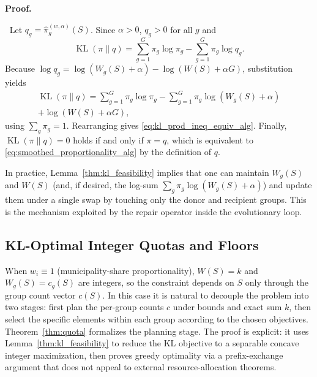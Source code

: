 \documentclass[10pt,journal]{IEEEtran}
\makeatletter
\newcommand{\1}{\mathbf{1}}
\DeclareMathOperator{\KL}{KL}
\theoremstyle{ieeethm}
\renewcommand{\IEEEproofname}{Proof}
\renewenvironment{IEEEproof}[1][\IEEEproofname]{%
  \par\pushQED{\IEEEQED}%
  \normalfont
  \topsep6\p@\@plus6\p@\relax
  \trivlist
  \item[]\textbf{#1.}\ignorespaces
}{%
  \popQED\endtrivlist\@endpefalse
}
\makeatother
\begin{document}
\begin{IEEEproof}
$\;\;$Let $q_g=\hat\pi^{(w,\alpha)}_g(S)$. Since $\alpha>0$, $q_g>0$ for all $g$ and
\[
\KL(\pi\|q)=\sum_{g=1}^G \pi_g\log\pi_g-\sum_{g=1}^G \pi_g\log q_g.
\]
Because $\log q_g=\log(W_g(S)+\alpha)-\log(W(S)+\alpha G)$, substitution yields
\begin{equation*}
\begin{aligned}
\KL(\pi\|q)
=
\sum_{g=1}^G \pi_g\log\pi_g
-\sum_{g=1}^G \pi_g\log(W_g(S)+\alpha)\\
+\log(W(S)+\alpha G),
\end{aligned}
\end{equation*}
using $\sum_g\pi_g=1$. Rearranging gives \eqref{eq:kl_prod_ineq_equiv_alg}.
Finally, $\KL(\pi\|q)=0$ holds if and only if $\pi=q$, which is equivalent to \eqref{eq:smoothed_proportionality_alg}
by the definition of $q$.
\end{IEEEproof}

In practice, Lemma~\ref{thm:kl_feasibility} implies that one can maintain $W_g(S)$ and $W(S)$ (and, if desired,
the log-sum $\sum_g \pi_g \log(W_g(S)+\alpha)$) and update them under a single swap by touching only the donor and
recipient groups. This is the mechanism exploited by the repair operator inside the evolutionary loop.

\subsection{KL-Optimal Integer Quotas and Floors}

When $w_i\equiv 1$ (municipality-share proportionality), $W(S)=k$ and $W_g(S)=c_g(S)$ are integers, so the constraint
depends on $S$ only through the group count vector $c(S)$. In this case it is natural to decouple the problem into
two stages: first plan the per-group counts $c$ under bounds and exact sum $k$, then select the specific elements
within each group according to the chosen objectives. Theorem~\ref{thm:quota} formalizes the planning stage.
The proof is explicit: it uses Lemma~\ref{thm:kl_feasibility} to reduce the KL objective to a separable concave
integer maximization, then proves greedy optimality via a prefix-exchange argument that does not appeal to
external resource-allocation theorems.
\end{document}
